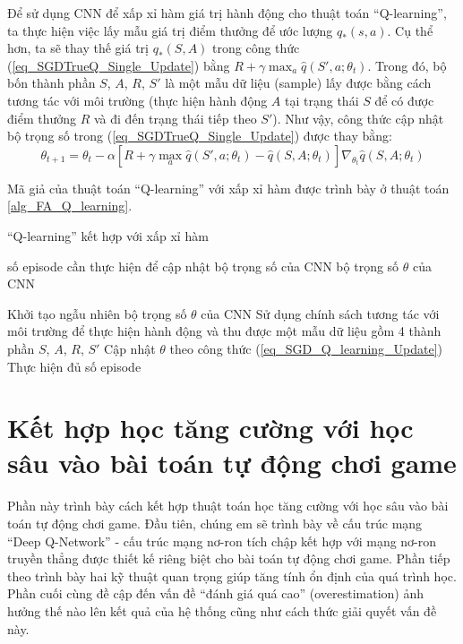 	Để sử dụng CNN để xấp xỉ hàm giá trị hành động cho thuật toán ``Q-learning'', ta thực hiện việc lấy mẫu giá trị điểm thưởng để ước lượng $q_{*}(s,a)$.
	Cụ thể hơn, ta sẽ thay thế giá trị $q_{*}(S,A)$ trong công thức (\ref{eq_SGDTrueQ_Single_Update}) bằng $R + \gamma \max_{a}\hat{q}(S', a;\theta_t)$.
	Trong đó, bộ bốn thành phần $S$, $A$, $R$, $S'$ là một mẫu dữ liệu (sample) lấy được bằng cách tương tác với môi trường (thực hiện hành động $A$ tại trạng thái $S$ để có được điểm thưởng $R$ và đi đến trạng thái tiếp theo $S'$).
	Như vậy, công thức cập nhật bộ trọng số trong (\ref{eq_SGDTrueQ_Single_Update}) được thay bằng:
	\begin{equation}
		\label{eq_SGD_Q_learning_Update}
		\theta_{t+1} = \theta_t - \alpha \left[ R + \gamma \max_{a}\hat{q}(S', a;\theta_t) - \hat{q}(S,A;\theta_t) \right] \nabla_{\theta_t} \hat{q}(S, A;\theta_t)	
	\end{equation}
	
	Mã giả của thuật toán ``Q-learning'' với xấp xỉ hàm được trình bày ở thuật toán \ref{alg_FA_Q_learning}.
	\begin{algorithm}
		\caption{``Q-learning'' kết hợp với xấp xỉ hàm}
		\label{alg_FA_Q_learning}
		\begin{algorithmic}[1]
			\renewcommand{\algorithmicrequire}{\textbf{Đầu vào:}}
			\renewcommand{\algorithmicensure}{\textbf{Đầu ra:}}
			\algnewcommand{}
			\algnewcommand\Operation{\item[\algorithmicoperation]}
			
			\Require số episode cần thực hiện để cập nhật bộ trọng số của CNN
			\Ensure bộ trọng số $\theta$ của CNN
			
			\Operation
			\State Khởi tạo ngẫu nhiên bộ trọng số $\theta$ của CNN
			\Repeat
				\State Sử dụng chính sách tương tác với môi trường để thực hiện hành động và thu được một mẫu dữ liệu gồm 4 thành phần $S$, $A$, $R$, $S'$
				\State Cập nhật $\theta$ theo công thức (\ref{eq_SGD_Q_learning_Update})
			\Until Thực hiện đủ số episode
		\end{algorithmic}
	\end{algorithm}
	
\section{Kết hợp học tăng cường với học sâu vào bài toán tự động chơi game}
	Phần này trình bày cách kết hợp thuật toán học tăng cường với học sâu vào bài toán tự động chơi game.
	Đầu tiên, chúng em sẽ trình bày về cấu trúc mạng ``Deep Q-Network'' \cite{mnihdqn2015} - cấu trúc mạng nơ-ron tích chập kết hợp với mạng nơ-ron truyền thẳng được thiết kế riêng biệt cho bài toán tự động chơi game.
	Phần tiếp theo trình bày hai kỹ thuật quan trọng giúp tăng tính ổn định của quá trình học.
	Phần cuối cùng đề cập đến vấn đề ``đánh giá quá cao'' (overestimation) ảnh hưởng thế nào lên kết quả của hệ thống cũng như cách thức giải quyết vấn đề này.
	
